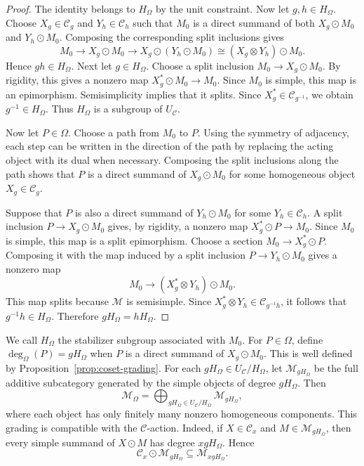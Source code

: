 \documentclass[11pt]{amsart}
\newcommand{\C}{\mathcal C}
\newcommand{\M}{\mathcal M}
\theoremstyle{definition}
\theoremstyle{remark}
\theoremstyle{plain}
\begin{document}
\begin{proof}
The identity belongs to $H_\Omega$ by the unit constraint. Now let $g,h\in H_\Omega$. Choose $X_g\in\C_g$ and $Y_h\in\C_h$ such that $M_0$ is a direct summand of both $X_g\odot M_0$ and $Y_h\odot M_0$. Composing the corresponding split inclusions gives
$$
M_0\rightarrow X_g\odot M_0\rightarrow X_g\odot(Y_h\odot M_0)\cong (X_g\otimes Y_h)\odot M_0.
$$
Hence $gh\in H_\Omega$. Next let $g\in H_\Omega$. Choose a split inclusion $M_0\to X_g\odot M_0$. By rigidity, this gives a nonzero map $X_g^*\odot M_0\rightarrow M_0$. Since $M_0$ is simple, this map is an epimorphism. Semisimplicity implies that it splits. Since $X_g^*\in\C_{g^{-1}}$, we obtain $g^{-1}\in H_\Omega$. Thus $H_\Omega$ is a subgroup of $U_{\C}$.

Now let $P\in\Omega$. Choose a path from $M_0$ to $P$. Using the symmetry of adjacency, each step can be written in the direction of the path by replacing the acting object with its dual when necessary. Composing the split inclusions along the path shows that $P$ is a direct summand of $X_g\odot M_0$ for some homogeneous object $X_g\in\C_g$.

Suppose that $P$ is also a direct summand of $Y_h\odot M_0$ for some $Y_h\in\C_h$. A split inclusion $P\to X_g\odot M_0$ gives, by rigidity, a nonzero map $X_g^*\odot P\rightarrow M_0$. Since $M_0$ is simple, this map is a split epimorphism. Choose a section $M_0\rightarrow X_g^*\odot P$. Composing it with the map induced by a split inclusion $P\to Y_h\odot M_0$ gives a nonzero map
$$
M_0\rightarrow (X_g^*\otimes Y_h)\odot M_0.
$$
This map splits because $\M$ is semisimple. Since $X_g^*\otimes Y_h\in\C_{g^{-1}h}$, it follows that $g^{-1}h\in H_\Omega$. Therefore $gH_\Omega=hH_\Omega$.
\end{proof}

We call $H_\Omega$ the stabilizer subgroup associated with $M_0$. For $P\in\Omega$, define $\deg_\Omega(P)=gH_\Omega$ when $P$ is a direct summand of $X_g\odot M_0$. This is well defined by Proposition~\ref{prop:coset-grading}. For each $gH_\Omega\in U_{\C}/H_\Omega$, let $\M_{gH_\Omega}$ be the full additive subcategory generated by the simple objects of degree $gH_\Omega$. Then
\[
\M_\Omega=\bigoplus_{gH_\Omega\in U_{\C}/H_\Omega}\M_{gH_\Omega},
\]
where each object has only finitely many nonzero homogeneous components. This grading is compatible with the $\C$-action. Indeed, if $X\in\C_x$ and $M\in\M_{gH_\Omega}$, then every simple summand of $X\odot M$ has degree $xgH_\Omega$. Hence
\begin{equation}\label{eq:coset-action}
\C_x\odot\M_{gH_\Omega}\subseteq\M_{xgH_\Omega}.
\end{equation}
\end{document}
